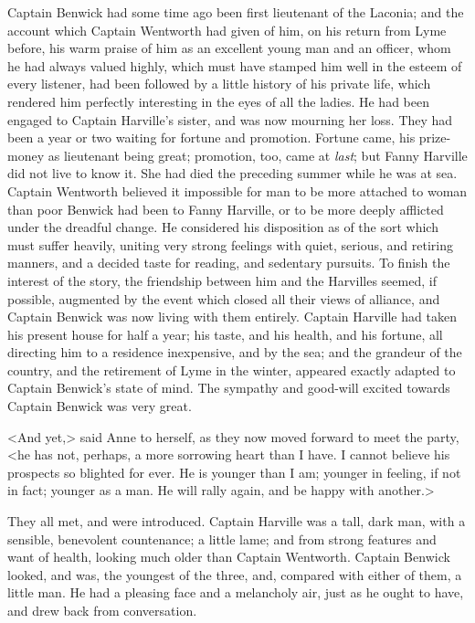 Captain Benwick had some time ago been first lieutenant of the Laconia; and the account which Captain Wentworth had given of him, on his return from Lyme before, his warm praise of him as an excellent young man and an officer, whom he had always valued highly, which must have stamped him well in the esteem of every listener, had been followed by a little history of his private life, which rendered him perfectly interesting in the eyes of all the ladies. He had been engaged to Captain Harville's sister, and was now mourning her loss. They had been a year or two waiting for fortune and promotion. Fortune came, his prize-money as lieutenant being great; promotion, too, came at \textit{last}; but Fanny Harville did not live to know it. She had died the preceding summer while he was at sea. Captain Wentworth believed it impossible for man to be more attached to woman than poor Benwick had been to Fanny Harville, or to be more deeply afflicted under the dreadful change. He considered his disposition as of the sort which must suffer heavily, uniting very strong feelings with quiet, serious, and retiring manners, and a decided taste for reading, and sedentary pursuits. To finish the interest of the story, the friendship between him and the Harvilles seemed, if possible, augmented by the event which closed all their views of alliance, and Captain Benwick was now living with them entirely. Captain Harville had taken his present house for half a year; his taste, and his health, and his fortune, all directing him to a residence inexpensive, and by the sea; and the grandeur of the country, and the retirement of Lyme in the winter, appeared exactly adapted to Captain Benwick's state of mind. The sympathy and good-will excited towards Captain Benwick was very great.

<And yet,> said Anne to herself, as they now moved forward to meet the party, <he has not, perhaps, a more sorrowing heart than I have. I cannot believe his prospects so blighted for ever. He is younger than I am; younger in feeling, if not in fact; younger as a man. He will rally again, and be happy with another.>

They all met, and were introduced. Captain Harville was a tall, dark man, with a sensible, benevolent countenance; a little lame; and from strong features and want of health, looking much older than Captain Wentworth. Captain Benwick looked, and was, the youngest of the three, and, compared with either of them, a little man. He had a pleasing face and a melancholy air, just as he ought to have, and drew back from conversation.

